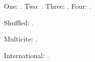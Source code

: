 \documentclass{ko-template}
\begin{document}
\noindent One: \parencite{one}. Two: \parencite{two}.
Three: \parencite{three}. Four: \parencite{four}.

\noindent Shuffled: \parencite{four,two,three,one}.

\noindent Multicite: \parencites{one}{two}{three}{four}.

\noindent International: \parencite{patent,chapter,accent,chinese,web}.
\nocite{*}
\printbibliography[heading=none]
\end{document}
